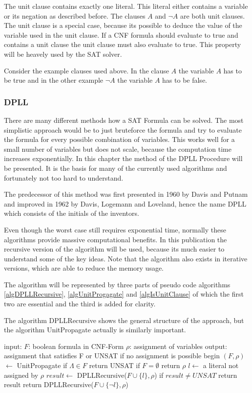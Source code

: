 The unit clause contains exactly one literal. This literal either contains a variable or its negation as described before. 
The clauses $A$ and $\lnot A$ are both unit clauses. 
The unit clause is a special case, because its possible to deduce the value of the variable used in the unit clause.
If a CNF formula should evaluate to true and contains a unit clause the unit clause must also evaluate to true. 
This property will be heavely used by the SAT solver.

Consider the example clauses used above. In the clause $A$ the variable $A$ has to be true and in the other example $\lnot A$ the variable $A$ has to be false.
\subsubsection{DPLL}

There are many different methods how a SAT Formula can be solved. The most simplistic approach would be to just bruteforce the formula and try to evaluate the formula for every possible combination of variables. This works well for a small number of variables but does not scale, because the computation time increases exponentially. In this chapter the method of the DPLL Procedure will be presented. It is the basis for many of the currently used algorithms and fortunately not too hard to understand.

The predecessor of this method was first presented in 1960 by Davis and Putnam and improved in 1962 by Davis, Logemann and Loveland, hence the name DPLL which consists of the initials of the inventors.

Even though the worst case still requires exponential time, normally these algorithms provide massive computational benefits. In this publication the recursive version of the algorithm will be used, because its much easier to understand some of the key ideas. Note that the algorithm also exists in iterative versions, which are able to reduce the memory usage.

The algorithm will be represented by three parts of pseudo code algorithms \ref{algDPLLRecursive}, \ref{algUnitProgagate} and \ref{algIsUnitClause} of which the first two are essential and the third is added for clarity.

The algorithm DPLLRecursive shows the general structure of the approach, but the algorithm UnitPropagate actually is similarly important.

\begin{algorithm}[caption={DPLLRecursive}, label={algDPLLRecursive}]
 input: $F$: boolean formula in CNF-Form
	$\rho$: assignment of variables
 output: assignment that satisfies F or 
	UNSAT if no assignment is possible
 begin
   $(F, \rho)$  $\gets$ UnitPropagate
   if $\Lambda \in F$
	return UNSAT
   if $F = \emptyset$
	return $\rho$
   $l \gets$ a literal not assigned by $\rho$
   $result \gets$ DPLLRecursive($F \cup \{l\}, \rho$)
   if $result \neq UNSAT$
	return result
   return DPLLRecursive($F \cup \{\lnot l\}, \rho$)
\end{algorithm}

